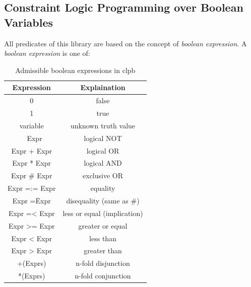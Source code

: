 \subsection{Constraint Logic Programming over Boolean Variables}\label{subsec:clpb}

All predicates of this library are based on the concept of \textit{boolean expression}. A \textit{boolean expression} is one of:
\begin{center}
    \begin{table}
        \begin{tabular}{||c c ||} 
        \hline
        Expression & Explaination \\ [0.5ex] 
        \hline\hline
        0 & false \\
        \hline
        1 & true \\ 
        \hline
        variable & unknown truth value \\
        \hline
        ~ Expr & logical NOT\\
        \hline
        Expr + Expr & logical OR \\
        \hline
        Expr * Expr & logical AND \\
        \hline
        Expr \# Expr & exclusive OR \\
        \hline
        Expr =:= Expr & equality \\
        \hline
        Expr =\= Expr & disequality (same as \#) \\
        \hline
        Expr =< Expr & less or equal (implication) \\
        \hline
        Expr >= Expr & greater or equal \\
        \hline
        Expr < Expr	& less than\\
        \hline
        Expr > Expr	& greater than \\
        \hline
        +(Exprs) & n-fold disjunction \\
        \hline
        *(Exprs) & n-fold conjunction \\
        \hline
        \end{tabular}
        \label{table:boolean_expressions}
        \caption{Admissible boolean expressions in clpb}
    \end{table}    
\end{center}

